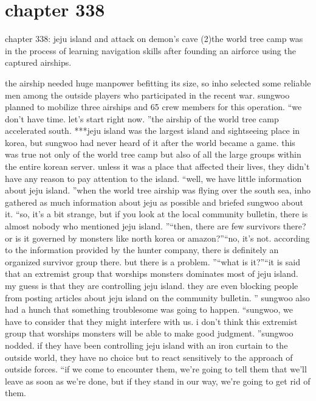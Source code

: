 \section{chapter 338}

chapter 338: jeju island and attack on demon’s cave (2)the world tree camp was in the process of learning navigation skills after founding an airforce using the captured airships.





the airship needed huge manpower befitting its size, so inho selected some reliable men among the outside players who participated in the recent war.
sungwoo planned to mobilize three airships and 65 crew members for this operation.
“we don’t have time.
 let’s start right now.
”the airship of the world tree camp accelerated south.
***jeju island was the largest island and sightseeing place in korea, but sungwoo had never heard of it after the world became a game.
 this was true not only of the world tree camp but also of all the large groups within the entire korean server.
unless it was a place that affected their lives, they didn’t have any reason to pay attention to the island.
“well, we have little information about jeju island.
”when the world tree airship was flying over the south sea, inho gathered as much information about jeju as possible and briefed sungwoo about it.
“so, it’s a bit strange, but if you look at the local community bulletin, there is almost nobody who mentioned jeju island.
”“then, there are few survivors there? or is it governed by monsters like north korea or amazon?”“no, it’s not.
 according to the information provided by the hunter company, there is definitely an organized survivor group there.
 but there is a problem.
”“what is it?”“it is said that an extremist group that worships monsters dominates most of jeju island.
 my guess is that they are controlling jeju island.
 they are even blocking people from posting articles about jeju island on the community bulletin.
”
sungwoo also had a hunch that something troublesome was going to happen.
“sungwoo, we have to consider that they might interfere with us.
 i don’t think this extremist group that worships monsters will be able to make good judgment.
”sungwoo nodded.
 if they have been controlling jeju island with an iron curtain to the outside world, they have no choice but to react sensitively to the approach of outside forces.
“if we come to encounter them, we’re going to tell them that we’ll leave as soon as we’re done, but if they stand in our way, we’re going to get rid of them.
